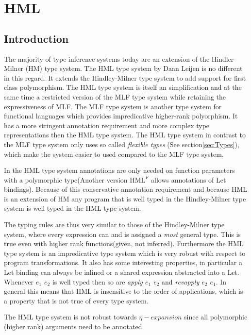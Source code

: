 \chapter{HML}
\label{HML}
\section{Introduction}
The majority of type inference systems today are an extension of the  Hindler-Milner (HM)\cite{HM} type system. The HML\cite{HML} type system by Daan Leijen is no different in this regard. It extends the Hindley-Milner type system to add support for first class polymorphism. The HML type system is itself an simplification and at the same time a restricted version of the MLF\cite{MLF} type system while retaining the expressiveness of MLF. The MLF type system is another type system for functional languages which provides impredicative higher-rank polyorphism. It has a more stringent annotation requirement and more complex type representations then the HML type system. The HML type system in contrast to the MLF type system only uses so called \emph{flexible types} (See section\ref{sec:Types}), which make the system easier to used compared to the  MLF type system.

In the HML type system annotations are only needed on function parameters with a polymorphic type(Another version $\textrm{HML}^F$ allows annotations of Let bindings). Because of this conservative annotation requirement and because HML is an extension of HM any program that is well typed in the Hindley-Milner type system is well typed in the HML type system.

The typing rules are thus very similar to those of the Hindley-Milner type system, where every expression can and is assigned a \emph{most} general type. This is true even with higher rank functions(given, not inferred). Furthermore the HML type system is an impredicative type system which is very robust with respect to program transformations. It also has some interesting properties, in particular a Let binding can always be inlined or a shared expression abstracted into a Let. Whenever \emph{$e_1$ $e_2$} is well typed then so are \emph{apply $e_1$ $e_2$} and \emph{revapply $e_2$ $e_1$}. In general this means that HML is insensitive to the order of applications, which is a property that is not true of every type system.

The HML type system is not robust towards $\eta-expansion$ since all polymorphic (higher rank) arguments need to be annotated.

